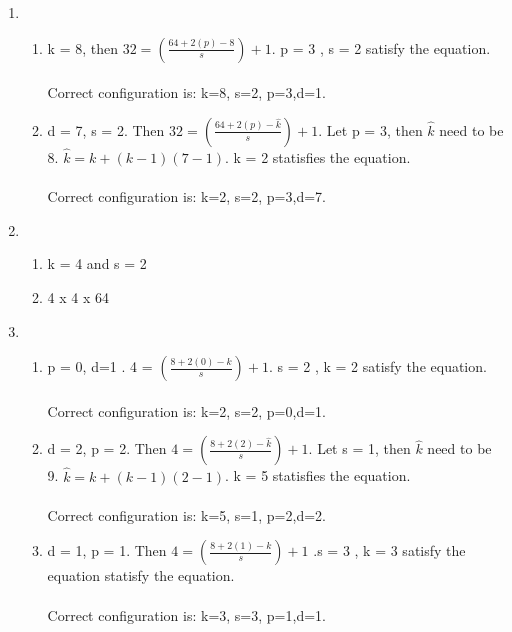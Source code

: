 \documentclass{article}
\begin{document}
  \begin{enumerate}
	\item
	  \begin{enumerate}
		\item
		k = 8, then $ 32 = (\frac{64 + 2(p) - 8}{s}) + 1$. p = 3 , s = 2 satisfy the equation.\\ \\
		Correct configuration is: k=8, s=2, p=3,d=1.
		\item
		d = 7, s = 2. Then $ 32 = (\frac{64 + 2(p) - \hat{k}}{s}) + 1$. Let p = 3, then $\hat{k}$ need to be 8. $\hat{k}= k + (k-1)(7-1)$. k = 2 statisfies the equation.\\ \\
		Correct configuration is: k=2, s=2, p=3,d=7.
	\end{enumerate}

	\item
	  \begin{enumerate}
	\item
	k = 4 and s = 2
	\item
	4 x 4 x 64
	 \end{enumerate}
	\item
	 \begin{enumerate}
	\item
	p = 0, d=1 . 4 = $(\frac{8 + 2(0) - k}{s}) + 1$. s = 2 , k = 2 satisfy the equation. \\ \\
	Correct configuration is: k=2, s=2, p=0,d=1.
	
	\item
	d = 2, p = 2. Then $ 4 = (\frac{8 + 2(2) - \hat{k}}{s}) + 1$. Let s = 1, then $\hat{k}$ need to be 9. $\hat{k}= k + (k-1)(2-1)$. k = 5 statisfies the equation.\\ \\
	Correct configuration is: k=5, s=1, p=2,d=2.

	\item
	d = 1, p = 1. Then $ 4 = (\frac{8 + 2(1) - k}{s}) + 1$ .s = 3 , k = 3 satisfy the equation statisfy the equation.\\ \\
	Correct configuration is: k=3, s=3, p=1,d=1.


	 \end{enumerate}
\end{enumerate}
\end{document}
